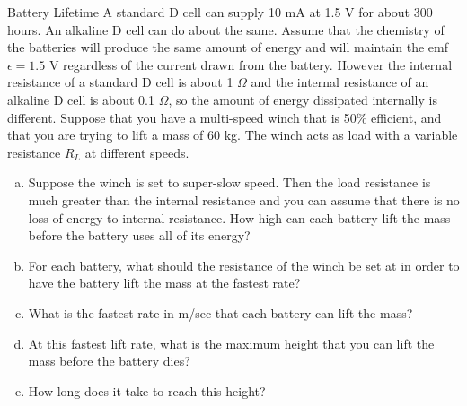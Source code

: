 \documentclass{esg8022pset}
\begin{document}
\begin{problem}{Battery Lifetime}
  A standard D cell can supply 10 mA at 1.5 V for about 300 hours. An alkaline D cell can do about the same. Assume that the chemistry of the batteries will produce the same amount of energy and will maintain the emf $\epsilon = 1.5$ V regardless of the current drawn from the battery. However the internal resistance of a standard D cell is about 1 $\Omega$ and the internal resistance of an alkaline D cell is about 0.1 $\Omega$, so the amount of energy dissipated internally is different. Suppose that you have a multi-speed winch that is 50\% efficient, and that you are trying to lift a mass of 60 kg. The winch acts as load with a variable resistance $R_L$ at different speeds.
  \begin{enumerate}[(a)]
    \item Suppose the winch is set to super-slow speed. Then the load resistance is much greater than the internal resistance and you can assume that there is no loss of energy to internal resistance. How high can each battery lift the mass before the battery uses all of its energy?
    \item For each battery, what should the resistance of the winch be set at in order to have the battery lift the mass at the fastest rate?
    \item What is the fastest rate in m/sec that each battery can lift the mass?
    \item At this fastest lift rate, what is the maximum height that you can lift the mass before the battery dies?
    \item How long does it take to reach this height?
  \end{enumerate}
\end{problem}
\end{document}
